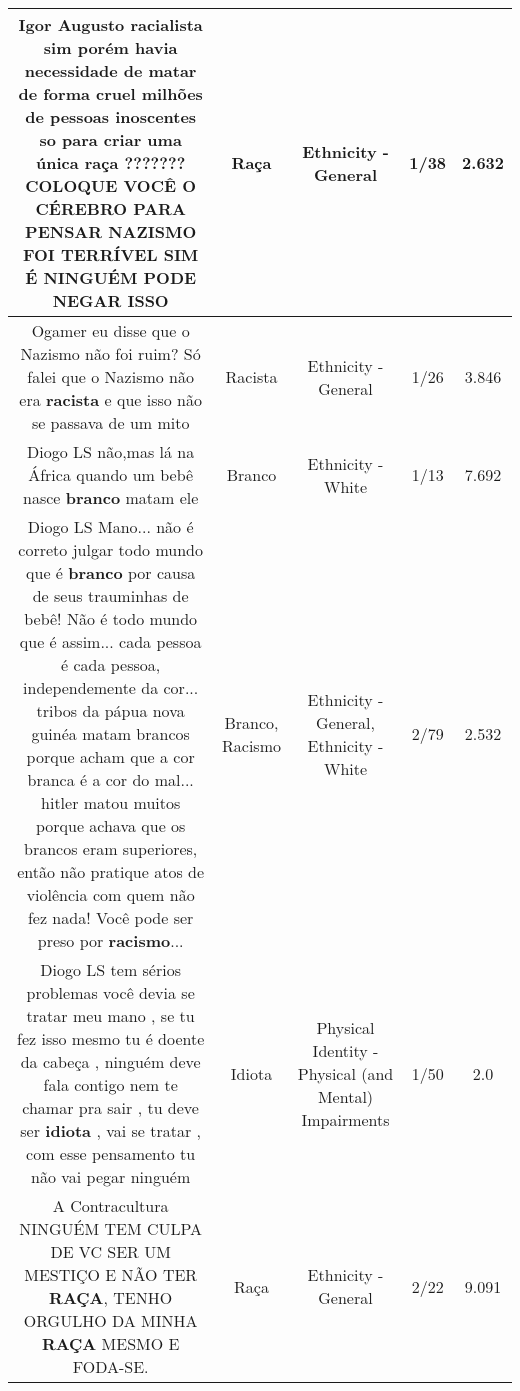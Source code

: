 \documentclass[11pt]{article}
\newlength\mylength
\begin{document}
\begin{center}
\begin{longtable}{|C{.65\mylength}|C{.30\mylength}|C{.12\mylength}|C{.12\mylength}|C{.12\mylength}|}
  \small Igor Augusto racialista sim porém havia necessidade de matar de forma cruel milhões de pessoas inoscentes so para criar uma única \textbf{raça} ??????? COLOQUE VOCÊ O CÉREBRO PARA PENSAR NAZISMO FOI TERRÍVEL SIM É NINGUÉM PODE NEGAR ISSO\normalsize   & Raça & Ethnicity - General & 1/38 & 2.632 \\  \hline
  \small Ogamer eu disse que o Nazismo não foi ruim? Só falei que o Nazismo não era \textbf{racista} e que isso não se passava de um mito\normalsize   & Racista & Ethnicity - General & 1/26 & 3.846 \\  \hline
  \small Diogo LS não,mas lá na África quando um bebê nasce \textbf{branco} matam ele\normalsize   & Branco & Ethnicity - White & 1/13 & 7.692 \\  \hline
  \small Diogo LS Mano... não é correto julgar todo mundo que é \textbf{branco} por causa de seus trauminhas de bebê! Não é todo mundo que é assim... cada pessoa é cada pessoa, independemente da cor... tribos da pápua nova guinéa matam brancos porque acham que a cor branca é a cor do mal... hitler matou muitos porque achava que os brancos eram superiores, então não pratique atos de violência com quem não fez nada! Você pode ser preso por \textbf{racismo}...\normalsize   & Branco, Racismo & Ethnicity - General, Ethnicity - White & 2/79 & 2.532 \\  \hline
  \small Diogo LS tem sérios problemas você devia se tratar meu mano , se tu fez isso mesmo tu é doente da cabeça , ninguém deve fala contigo nem te chamar pra sair , tu deve ser \textbf{idiota} , vai se tratar , com esse pensamento tu não vai pegar ninguém\normalsize   & Idiota & Physical Identity - Physical (and Mental) Impairments & 1/50 & 2.0 \\  \hline
  \small A Contracultura NINGUÉM TEM CULPA DE VC SER UM MESTIÇO E NÃO TER \textbf{RAÇA}, TENHO ORGULHO DA MINHA \textbf{RAÇA} MESMO E FODA-SE.\normalsize   & Raça & Ethnicity - General & 2/22 & 9.091 \\  \hline

\end{longtable}
\end{center}
\end{document}
